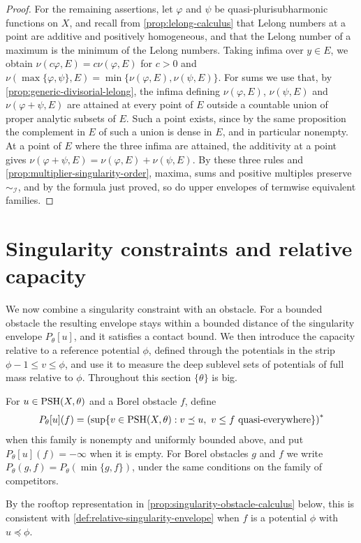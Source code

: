 \begin{proof}
For the remaining assertions, let $\varphi$ and $\psi$ be quasi-plurisubharmonic functions on $X$, and recall from \cref{prop:lelong-calculus} that Lelong numbers at a point are additive and positively homogeneous, and that the Lelong number of a maximum is the minimum of the Lelong numbers. Taking infima over $y\in E$, we obtain $\nu(c\varphi,E)=c\nu(\varphi,E)$ for $c>0$ and $\nu(\max\{\varphi,\psi\},E)=\min\{\nu(\varphi,E),\nu(\psi,E)\}$. For sums we use that, by \cref{prop:generic-divisorial-lelong}, the infima defining $\nu(\varphi,E)$, $\nu(\psi,E)$ and $\nu(\varphi+\psi,E)$ are attained at every point of $E$ outside a countable union of proper analytic subsets of $E$. Such a point exists, since by the same proposition the complement in $E$ of such a union is dense in $E$, and in particular nonempty. At a point of $E$ where the three infima are attained, the additivity at a point gives $\nu(\varphi+\psi,E)=\nu(\varphi,E)+\nu(\psi,E)$. By these three rules and \cref{prop:multiplier-singularity-order}, maxima, sums and positive multiples preserve $\sim_{\mathcal I}$, and by the formula just proved, so do upper envelopes of termwise equivalent families.
\end{proof}

\section{Singularity constraints and relative capacity}
\label{sec:singularity-obstacles-relative-capacity}
We now combine a singularity constraint with an obstacle. For a bounded obstacle the resulting envelope stays within a bounded distance of the singularity envelope $P_\theta[u]$, and it satisfies a contact bound. We then introduce the capacity relative to a reference potential $\phi$, defined through the potentials in the strip $\phi-1\leq v\leq\phi$, and use it to measure the deep sublevel sets of potentials of full mass relative to $\phi$. Throughout this section $\{\theta\}$ is big.

\begin{definition}\label{def:singularity-constrained-obstacle}
For $u\in\mathrm{PSH}(X,\theta)$ and a Borel obstacle $f$, define
\[
 P_\theta[u](f)=\left(\sup\{v\in\mathrm{PSH}(X,\theta):
             v\preceq u,\ v\leq f\text{ quasi-everywhere}\}\right)^*
\]
when this family is nonempty and uniformly bounded above, and put $P_\theta[u](f)=-\infty$ when it is empty. For Borel obstacles $g$ and $f$ we write $P_\theta(g,f)=P_\theta(\min\{g,f\})$, under the same conditions on the family of competitors.
\end{definition}
By the rooftop representation in \cref{prop:singularity-obstacle-calculus} below, this is consistent with \cref{def:relative-singularity-envelope} when $f$ is a potential $\phi$ with $u\preceq\phi$.

